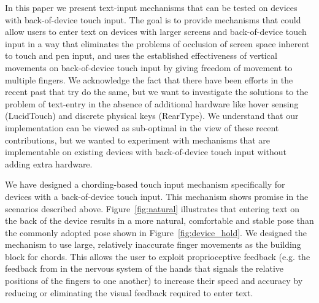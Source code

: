 In this paper we present text-input mechanisms that can be tested on devices with back-of-device touch input. The goal is to provide mechanisms that could allow users to enter text on devices with larger screens and back-of-device touch input in a way that eliminates the problems of occlusion of screen space inherent to touch and pen input, and uses the established effectiveness of vertical movements on back-of-device touch input  by giving freedom of movement to multiple fingers. We acknowledge the fact that there have been efforts in the recent past  that try do the same, but we want to investigate the solutions to the problem of text-entry in the absence of additional hardware like hover sensing (LucidTouch) and discrete physical keys (RearType). We understand that our implementation can be viewed as sub-optimal in the view of these recent contributions, but we wanted to experiment with mechanisms that are implementable on existing devices with back-of-device touch input without adding extra hardware.

We have designed a chording-based touch input mechanism specifically for devices with a back-of-device touch input.  This mechanism shows promise in the scenarios described above.  Figure~\ref{fig:natural} illustrates that entering text on the back of the device results in a more natural, comfortable and stable pose than the commonly adopted pose shown in Figure~\ref{fig:device_hold}.  We designed the mechanism to use large, relatively inaccurate finger movements as the building
block for chords.  This allows the user to exploit proprioceptive feedback (e.g. the feedback from in the nervous system of the hands that signals the relative positions of the fingers to one another) to
increase their speed and accuracy by reducing or eliminating the visual feedback required to enter text. 


